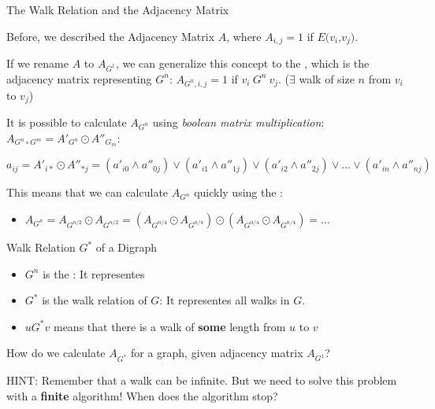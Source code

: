 \begin{frame}[t]{The Walk Relation and the Adjacency Matrix}

  Before, we described the Adjacency Matrix $A$, where $A_{i,j}=1$ if $E(v_i$,$v_j)$.
  \bigskip
  
  If we rename $A$ to $A_{G^1}$, we can generalize this concept to the , which is the adjacency matrix representing $G^n$: $A_{G^n,i,j}=1$ if $v_i~G^n~v_j$. ($\exists$ walk of size $n$ from $v_i$ to $v_j$)
  \bigskip

  It is possible to calculate $A_{G^n}$ using \emph{boolean matrix multiplication}: $A_{G^n\circ G^m} = A'_{G^n} \odot A''_{G_m}$:

  \begin{equation*}
    a_{ij} = A'_{i*} \odot A''_{*j} = (a'_{i0} \land a''_{0j}) \lor (a'_{i1} \land a''_{1j}) \lor (a'_{i2} \land a''_{2j}) \lor \ldots \lor (a'_{in} \land a''_{nj})
  \end{equation*}\medskip

  This means that we can calculate $A_{G^n}$ quickly using the :

  \begin{itemize}
    \item $A_{G^n} = A_{G^{n/2}} \odot A_{G^{n/2}} = (A_{G^{n/4}} \odot A_{G^{n/4}}) \odot (A_{G^{n/4}} \odot A_{G^{n/4}}) = \ldots$
  \end{itemize}

\end{frame}

\begin{frame}[t]{Walk Relation $G^*$ of a Digraph}

  \begin{itemize}
  \item $G^n$ is the : It representes 
  \item $G^*$ is the \alert{walk relation of $G$}: It representes \alert{all walks in $G$}.
  \item $u G^* v$ means that \alert{there is a walk of {\bf some} length from $u$ to $v$}\\
  \end{itemize}\bigskip

   How do we calculate $A_{G^*}$ for a graph, given adjacency matrix $A_{G^1}$?\bigskip

  \alert{HINT:} Remember that a walk can be infinite. But we need to solve this problem with a {\bf finite} algorithm! When does the algorithm stop?
\end{frame}

